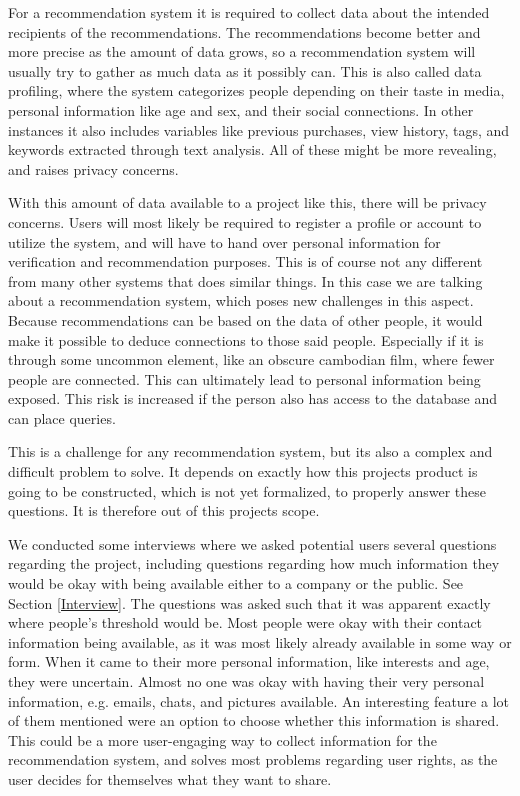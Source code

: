 For a recommendation system it is required to collect data about the intended recipients of the recommendations. The recommendations become better and more precise as the amount of data grows, so a recommendation system will usually try to gather as much data as it possibly can. This is also called data profiling, where the system categorizes people depending on their taste in media, personal information like age and sex, and their social connections. In other instances it also includes variables like previous purchases, view history, tags, and keywords extracted through text analysis. All of these might be more revealing, and raises privacy concerns.\cite{UserRights2}

With this amount of data available to a project like this, there will be privacy concerns. Users will most likely be required to register a profile or account to utilize the system, and will have to hand over personal information for verification and recommendation purposes. This is of course not any different from many other systems that does similar things. In this case we are talking about a recommendation system, which poses new challenges in this aspect. Because recommendations can be based on the data of other people, it would make it possible to deduce connections to those said people. Especially if it is through some uncommon element, like an obscure cambodian film, where fewer people are connected. This can ultimately lead to personal information being exposed. This risk is increased if the person also has access to the database and can place queries.\cite{UserRights1}

This is a challenge for any recommendation system, but its also a complex and difficult problem to solve. It depends on exactly how this projects product is going to be constructed, which is not yet formalized, to properly answer these questions. It is therefore out of this projects scope.

We conducted some interviews where we asked potential users several questions regarding the project, including questions regarding how much information they would be okay with being available either to a company or the public. See Section \ref{Interview}. The questions was asked such that it was apparent exactly where people’s threshold would be. Most people were okay with their contact information being available, as it was most likely already available in some way or form. When it came to their more personal information, like interests and age, they were uncertain. Almost no one was okay with having their very personal information, e.g. emails, chats, and pictures available. An interesting feature a lot of them mentioned were an option to choose whether this information is shared. This could be a more user-engaging way to collect information for the recommendation system, and solves most problems regarding user rights, as the user decides for themselves what they want to share.
